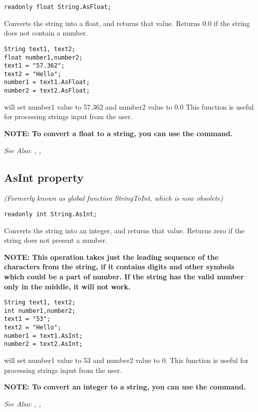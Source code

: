 \begin{verbatim}
readonly float String.AsFloat;
\end{verbatim}
Converts the string into a float, and returns that value. Returns
0.0 if the string does not contain a number.

\begin{verbatim}
String text1, text2;
float number1,number2;
text1 = "57.362";
text2 = "Hello";
number1 = text1.AsFloat;
number2 = text2.AsFloat;
\end{verbatim}
will set number1 value to 57.362 and number2 value to 0.0
This function is useful for processing strings input from the user.

\bf{NOTE:} To convert a float to a string, you can use the 
command.

\it{See Also:} ,
,


\subsection{AsInt property}\label{String.AsInt}%

\it{(Formerly known as global function StringToInt, which is now obsolete)}

\begin{verbatim}
readonly int String.AsInt;
\end{verbatim}
Converts the string into an integer, and returns that value. Returns
zero if the string does not present a number.

\bf{NOTE:} This operation takes just the leading sequence of the characters from the string,
if it contains digits and other symbols which could be a part of number. If the string has the
valid number only in the middle, it will not work.

\begin{verbatim}
String text1, text2;
int number1,number2;
text1 = "53";
text2 = "Hello";
number1 = text1.AsInt;
number2 = text2.AsInt;
\end{verbatim}
will set number1 value to 53 and number2 value to 0.
This function is useful for processing strings input from the user.

\bf{NOTE:} To convert an integer to a string, you can use the 
command.

\it{See Also:} , ,


